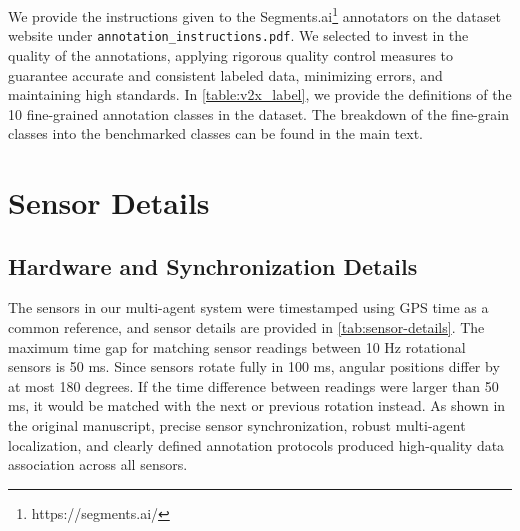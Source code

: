 We provide the instructions given to the Segments.ai\footnote{https://segments.ai/} annotators on the dataset website under \texttt{annotation\_instructions.pdf}.
We selected to invest in the quality of the annotations,
applying rigorous quality control measures to guarantee accurate and consistent labeled data, minimizing errors, and maintaining high standards.
In \autoref{table:v2x_label}, we provide the definitions of the 10 fine-grained annotation classes in the \ours dataset. The breakdown of the fine-grain classes into the benchmarked classes can be found in the main text.


\section{Sensor Details}

\subsection{Hardware and Synchronization Details}

\begin{table}[th!]
\vspace{-8px}
\centering
{}

\vspace{-4px}
\caption{\small\textbf{Hardware specifications} }
\label{tab:sensor-details}

\vspace{-8px}
\end{table}

\noindent
The sensors in our multi-agent system were timestamped using GPS time as a common reference, and sensor details are provided in \autoref{tab:sensor-details}.
The maximum time gap for matching sensor readings between 10 Hz rotational sensors is 50 ms. 
Since sensors rotate fully in 100 ms, angular positions differ by at most 180 degrees.
If the time difference between readings were larger than 50 ms, it would be 
matched with the next or previous rotation instead.
As shown in the original manuscript, precise sensor synchronization, robust multi-agent localization, and clearly defined annotation protocols produced high-quality data association across all sensors.

